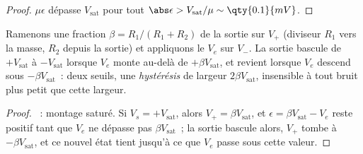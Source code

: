 \begin{proof}
$\mu\epsilon$ dépasse $V_{\mathrm{sat}}$ pour tout $\abs\epsilon >
V_{\mathrm{sat}}/\mu \sim \qty{0.1}{mV}$.
\end{proof}

\begin{proposition}\label{prop:b1:operational-amplifier:schmitt}
Ramenons une fraction $\beta = R_1/(R_1 + R_2)$ de la sortie sur $V_+$
(diviseur $R_1$ vers la masse, $R_2$ depuis la sortie) et appliquons le
 $V_e$ sur $V_-$. La sortie bascule de $+V_{\mathrm{sat}}$ à
$-V_{\mathrm{sat}}$ lorsque $V_e$ monte au-delà de $+\beta V_{\mathrm{sat}}$,
et revient lorsque $V_e$ descend sous $-\beta V_{\mathrm{sat}}$~: deux
seuils, une \emph{hystérésis} de largeur $2\beta V_{\mathrm{sat}}$,
insensible à tout bruit plus petit que cette largeur.
\end{proposition}

\begin{proof}
~: montage saturé. Si $V_s = +V_{\mathrm{sat}}$, alors $V_+ =
\beta V_{\mathrm{sat}}$, et $\epsilon = \beta V_{\mathrm{sat}} - V_e$
reste positif tant que $V_e$ ne dépasse pas $\beta V_{\mathrm{sat}}$~;
la sortie bascule alors, $V_+$ tombe à $-\beta V_{\mathrm{sat}}$, et ce
nouvel état tient jusqu'à ce que $V_e$ passe sous cette valeur.
\end{proof}

